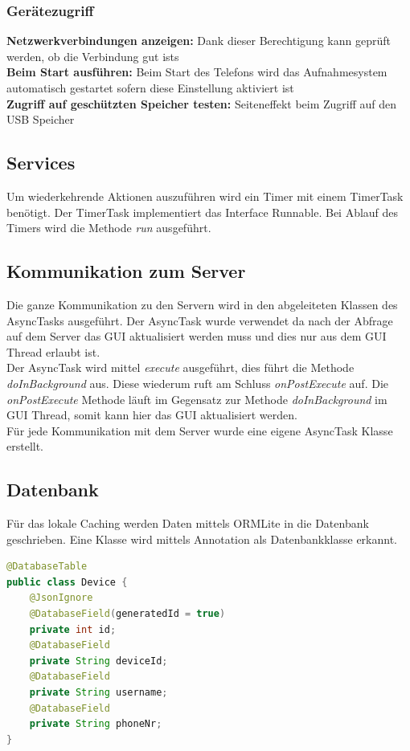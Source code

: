 \subsubsection{Gerätezugriff}
\textbf{Netzwerkverbindungen anzeigen:} Dank dieser Berechtigung kann geprüft werden, ob die Verbindung gut ists \\
\textbf{Beim Start ausführen:} Beim Start des Telefons wird das Aufnahmesystem automatisch gestartet sofern diese Einstellung aktiviert ist \\
\textbf{Zugriff auf geschützten Speicher testen:} Seiteneffekt beim Zugriff auf den USB Speicher

\subsection{Services}
Um wiederkehrende Aktionen auszuführen wird ein Timer mit einem TimerTask benötigt. Der TimerTask implementiert das Interface Runnable. Bei Ablauf des Timers wird die Methode \textit{run} ausgeführt. 

\subsection{Kommunikation zum Server}
Die ganze Kommunikation zu den Servern wird in den abgeleiteten Klassen des AsyncTasks ausgeführt. Der AsyncTask wurde verwendet da nach der Abfrage auf dem Server das GUI aktualisiert werden muss und dies nur aus dem GUI Thread erlaubt ist. \\
Der AsyncTask wird mittel \textit{execute} ausgeführt, dies führt die Methode \textit{doInBackground} aus. Diese wiederum ruft am Schluss \textit{onPostExecute} auf. Die \textit{onPostExecute} Methode läuft im Gegensatz zur Methode \textit{doInBackground} im GUI Thread, somit kann hier das GUI aktualisiert werden.
\\Für jede Kommunikation mit dem Server wurde eine eigene AsyncTask Klasse erstellt.

\subsection{Datenbank}
Für das lokale Caching werden Daten mittels ORMLite in die Datenbank geschrieben. Eine Klasse wird mittels Annotation als Datenbankklasse erkannt.

\begin{lstlisting}[language=Java, caption=ORMLite Annotations]
@DatabaseTable
public class Device {
	@JsonIgnore
	@DatabaseField(generatedId = true)
	private int id;
	@DatabaseField
	private String deviceId;
	@DatabaseField
	private String username;
	@DatabaseField
	private String phoneNr;
}
\end{lstlisting}

